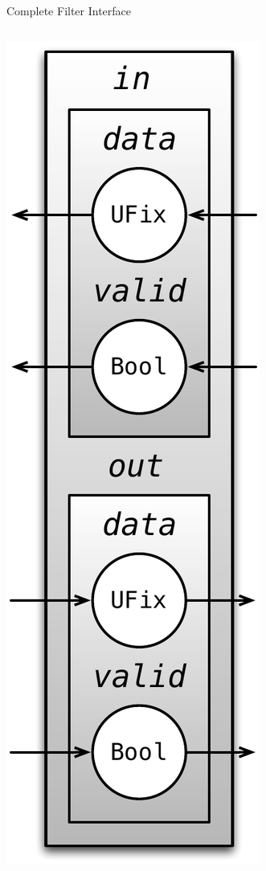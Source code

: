 \documentclass[xcolor=pdflatex,dvipsnames,table]{beamer}
\begin{document}
\begin{frame}[fragile]{Complete Filter Interface}
\begin{columns}
\begin{center}
\includegraphics[height=0.9\textheight]{figs/filter-io.pdf} 
\end{center}

\end{columns}
\end{frame}
\end{document}
